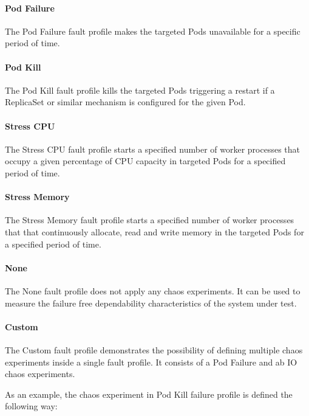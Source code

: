 \paragraph{Pod Failure} The Pod Failure fault profile makes the targeted Pods unavailable for a specific period of time.

\paragraph{Pod Kill} The Pod Kill fault profile kills the targeted Pods triggering a restart if a ReplicaSet or similar mechanism is configured for the given Pod.

\paragraph{Stress CPU} The Stress CPU fault profile starts a specified number of worker processes that occupy a given percentage of CPU capacity in targeted Pods for a specified period of time.

\paragraph{Stress Memory} The Stress Memory fault profile starts a specified number of worker processes that that continuously allocate, read and write memory in the targeted Pods for a specified period of time.

\paragraph{None} The None fault profile does not apply any chaos experiments. It can be used to measure the failure free dependability characteristics of the system under test.

\paragraph{Custom} The Custom fault profile demonstrates the possibility of defining multiple chaos experiments inside a single fault profile. It consists of a Pod Failure and ab IO chaos experiments.

As an example, the chaos experiment in Pod Kill failure profile is defined the following way:

